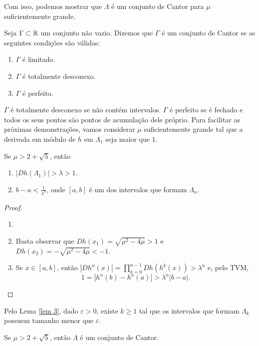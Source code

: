 Com isso, podemos mostrar que $\Lambda$ é um conjunto de Cantor para $\mu$ suficientemente grande.

\begin{definition}
Seja $\Gamma \subset \mathbb{R}$ um conjunto não vazio. Dizemos que $\Gamma$ é um conjunto de Cantor se as seguintes condições são válidas:
\begin{enumerate}[label=\roman*.]
\item $\Gamma$ é limitado.
\item $\Gamma$ é totalmente desconexo.
\item $\Gamma$ é perfeito.
\end{enumerate}
\end{definition}

$\Gamma$ é totalmente desconexo se não contém intervalos. $\Gamma$ é perfeito se é fechado e todos os seus pontos são pontos de acumulação dele próprio. Para facilitar as próximas demonstrações, vamos considerar $\mu$ suficientemente grande tal que a derivada em módulo de $h$ em $\Lambda_1$ seja maior que $1$.

\begin{lemma}\label{lem 3}
Se $\mu > 2 + \sqrt{5}$, então
\begin{enumerate}
\item  $|D h(\Lambda_1)| > \lambda > 1$.
\item $b - a < \frac{1}{\lambda^n}$, onde $[a, b]$ é um dos intervalos que formam $\Lambda_n$.
\end{enumerate}
\end{lemma}

\begin{proof}
\begin{enumerate}\item[]
\item Basta observar que $D h(x_1) = \sqrt{\mu^2 - 4\mu} > 1$ e $D h(x_2) = -\sqrt{\mu^2 - 4\mu} < -1$.
\item Se $x \in [a, b]$, então $|D h^n(x)| = \prod_{k=0}^{n-1} D h(h^k(x)) > \lambda^n$ e, pelo TVM,
$$1 = |h^n(b) - h^n(a)| > \lambda^n|b - a|.$$
\end{enumerate}
\end{proof} 

Pelo Lema \ref{lem 3}, dado $\varepsilon > 0$, existe $k \geq 1$ tal que os intervalos que formam $\Lambda_k$ possuem tamanho menor que $\varepsilon$. 

\begin{theorem}\label{teo 3-1}
Se $\mu > 2 + \sqrt{5}$, então $\Lambda$ é um conjunto de Cantor.
\end{theorem}

